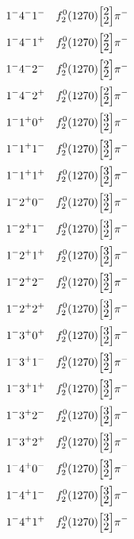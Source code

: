 \documentclass[10pt,a4paper]{article}
\def\dst{\displaystyle}
\def\vsp{\hbox{\vrule height12.5pt depth3.5pt width0pt}}
\def\ells#1#2{\Big[\hskip-5pt\vsp\begin{array}{c}\dst#1\\[-4pt]\dst#2\end{array}\vsp\hskip-5pt\Big]}
\begin{document}
\begin{align*} 
 \begin{aligned}
1^{-}4^{-}1^{-}\quad & f_2^0(1270)\ells{2}{2}\pi^-\\
1^{-}4^{-}1^{+}\quad & f_2^0(1270)\ells{2}{2}\pi^-\\
1^{-}4^{-}2^{-}\quad & f_2^0(1270)\ells{2}{2}\pi^-\\
1^{-}4^{-}2^{+}\quad & f_2^0(1270)\ells{2}{2}\pi^-\\
1^{-}1^{+}0^{+}\quad & f_2^0(1270)\ells{3}{2}\pi^-\\
1^{-}1^{+}1^{-}\quad & f_2^0(1270)\ells{3}{2}\pi^-\\
1^{-}1^{+}1^{+}\quad & f_2^0(1270)\ells{3}{2}\pi^-\\
1^{-}2^{+}0^{-}\quad & f_2^0(1270)\ells{3}{2}\pi^-\\
1^{-}2^{+}1^{-}\quad & f_2^0(1270)\ells{3}{2}\pi^-\\
1^{-}2^{+}1^{+}\quad & f_2^0(1270)\ells{3}{2}\pi^-\\
1^{-}2^{+}2^{-}\quad & f_2^0(1270)\ells{3}{2}\pi^-\\
1^{-}2^{+}2^{+}\quad & f_2^0(1270)\ells{3}{2}\pi^-\\
1^{-}3^{+}0^{+}\quad & f_2^0(1270)\ells{3}{2}\pi^-\\
1^{-}3^{+}1^{-}\quad & f_2^0(1270)\ells{3}{2}\pi^-\\
1^{-}3^{+}1^{+}\quad & f_2^0(1270)\ells{3}{2}\pi^-\\
1^{-}3^{+}2^{-}\quad & f_2^0(1270)\ells{3}{2}\pi^-\\
1^{-}3^{+}2^{+}\quad & f_2^0(1270)\ells{3}{2}\pi^-\\
1^{-}4^{+}0^{-}\quad & f_2^0(1270)\ells{3}{2}\pi^-\\
1^{-}4^{+}1^{-}\quad & f_2^0(1270)\ells{3}{2}\pi^-\\
1^{-}4^{+}1^{+}\quad & f_2^0(1270)\ells{3}{2}\pi^-\\
\end{aligned} 
 \end{align*}\pagebreak
\end{document}
